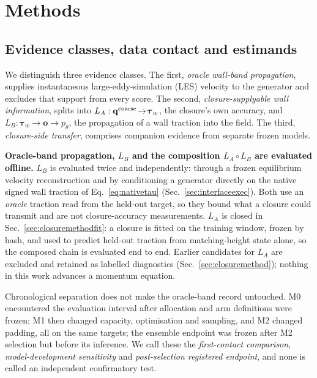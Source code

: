\section{Methods}\label{sec:methods}

\subsection{Evidence classes, data contact and estimands}\label{sec:evidence}

We distinguish three evidence classes. The first, \emph{oracle wall-band propagation}, supplies
instantaneous large-eddy-simulation (LES) velocity to the generator and excludes that support from
every score. The second, \emph{closure-supplyable wall information}, splits into
$L_A:\mathbf q^{\rm coarse}\!\to\!\boldsymbol\tau_w$, the closure's own accuracy, and
$L_B:\boldsymbol\tau_w\!\to\!\mathbf o\!\to\!p_\theta$, the propagation of a wall traction into the
field. The third, \emph{closure-side transfer}, comprises companion evidence from separate
frozen models.

\textbf{Oracle-band propagation, $L_B$ and the composition $L_A\!\circ\!L_B$ are evaluated offline.}
$L_B$ is evaluated twice and independently: through a frozen equilibrium velocity reconstruction and by conditioning a
generator directly on the native signed wall traction of Eq.~\eqref{eq:nativetau}
(Sec.~\ref{sec:interfaceexec}). Both use an \emph{oracle} traction read from the held-out target,
so they bound what a closure could transmit and are not closure-accuracy measurements. $L_A$ is
closed in Sec.~\ref{sec:closuremethodfit}: a closure is fitted on the training window, frozen by
hash, and used to predict held-out traction from matching-height state alone, so the composed
chain is evaluated end to end. Earlier candidates for $L_A$ are excluded and retained as labelled
diagnostics (Sec.~\ref{sec:closuremethod}); nothing in this work
advances a momentum equation.

Chronological separation does not make the oracle-band record untouched. M0 encountered the evaluation interval after
allocation and arm definitions were frozen; M1 then changed capacity, optimisation and sampling,
and M2 changed padding, all on the same targets; the ensemble endpoint was frozen after M2
selection but before its inference. We call these the \emph{first-contact comparison},
\emph{model-development sensitivity} and \emph{post-selection registered endpoint}, and none is
called an independent confirmatory test.

